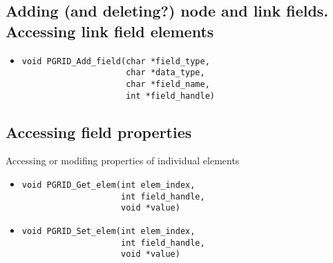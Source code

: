 \documentclass[12pt]{article}
\begin{document}
\subsection{Adding (and deleting?) node and link fields. Accessing link field
elements}
\begin{itemize}
\item \begin{verbatim}
void PGRID_Add_field(char *field_type,
                     char *data_type,
                     char *field_name,
                     int *field_handle)
\end{verbatim}
\end{itemize}
\subsection{Accessing field properties}
Accessing or modifing properties of individual elements
\begin{itemize}
\item \begin{verbatim}
void PGRID_Get_elem(int elem_index,
                    int field_handle,
                    void *value)
\end{verbatim}
\item \begin{verbatim}
void PGRID_Set_elem(int elem_index,
                    int field_handle,
                    void *value)
\end{verbatim}
\end{itemize}
\end{document}
